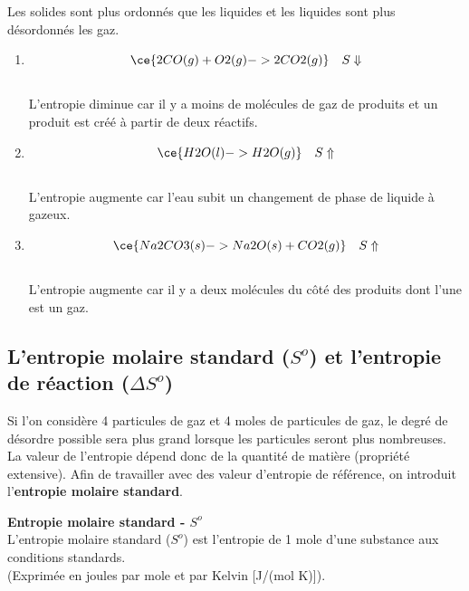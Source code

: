 \documentclass[
  11pt,
  a4paper,
  openany]{book}
\providecommand{\tightlist}{%
  \setlength{\itemsep}{0pt}\setlength{\parskip}{0pt}}
\begin{document}
\begin{Answer}

Les solides sont plus ordonnés que les liquides et les liquides sont plus désordonnés les gaz.

\begin{enumerate}
\def\labelenumi{\alph{enumi}.}
\tightlist
\item
  \[ \ce{2 CO(g) + O2(g) -> 2 CO2(g)} \quad S \Downarrow \]\\
  L'entropie diminue car il y a moins de molécules de gaz de produits et un produit est créé à partir de deux réactifs.
\item
  \[ \ce{H2O(l) -> H2O(g)} \quad S \Uparrow \]\\
  L'entropie augmente car l'eau subit un changement de phase de liquide à gazeux.
\item
  \[ \ce{Na2CO3(s) -> Na2O(s) +CO2(g)} \quad S \Uparrow \]\\
  L'entropie augmente car il y a deux molécules du côté des produits dont l'une est un gaz.
\end{enumerate}

\end{Answer}

\subsection{\texorpdfstring{L'entropie molaire standard (\(S^o\)) et l'entropie de réaction (\(\Delta S^o\))}{L'entropie molaire standard (S\^{}o) et l'entropie de réaction (\textbackslash Delta S\^{}o)}}\label{lentropie-molaire-standard-so-et-lentropie-de-ruxe9action-delta-so}

Si l'on considère 4 particules de gaz et 4 moles de particules de gaz, le degré de désordre possible sera plus grand lorsque les particules seront plus nombreuses. La valeur de l'entropie dépend donc de la quantité de matière (propriété extensive). Afin de travailler avec des valeur d'entropie de référence, on introduit l'\textbf{entropie molaire standard}.

\begin{tcolorbox}
\textbf{Entropie molaire standard - \(S^o\)}\\
L'entropie molaire standard (\(S^o\)) est l'entropie de 1 mole d'une substance aux conditions standards.\\
(Exprimée en joules par mole et par Kelvin {[}J/(mol K){]}).

\end{tcolorbox}
\end{document}
